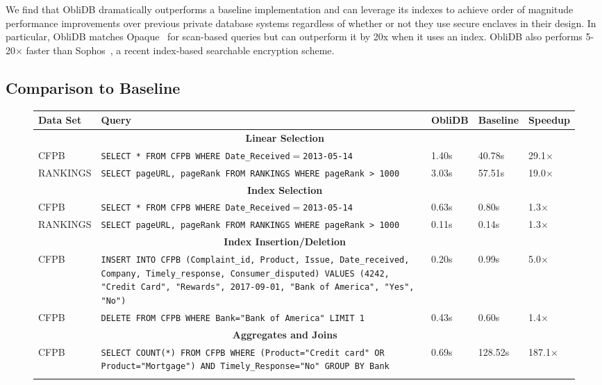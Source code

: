 \documentclass[letterpaper,twocolumn,10pt]{article}
\def\name/{ObliDB}
\begin{document}
We find that \name/ dramatically outperforms a baseline implementation and can leverage its indexes to achieve order of magnitude performance improvements over previous private database systems regardless of whether or not they use secure enclaves in their design. In particular, \name/ matches Opaque~\cite{ZDB+17} for scan-based queries but can outperform it by 20x when it uses an index. \name/ also performs 5-20$\times$ faster than Sophos~\cite{Bost16}, a recent index-based searchable encryption scheme.

\subsection{Comparison to Baseline}
\begin{figure}
\small
\centering
\begin{tabular}{p{2.2cm} p{8cm} l l l}
 \textbf{Data Set}& \textbf{Query}& \textbf{\name/} & \textbf{Baseline} & \textbf{Speedup}\\ \hline\rule{0pt}{2ex}
 &\multicolumn{2}{c}{\textbf{Linear Selection}}\\\rule{0pt}{2ex}
CFPB & \texttt{SELECT * FROM CFPB WHERE Date\_Received$=$2013-05-14}& 1.40s & 40.78s & 29.1$\times$\\\rule{0pt}{2ex}
RANKINGS & \texttt{SELECT pageURL, pageRank FROM RANKINGS WHERE pageRank > 1000 }& 3.03s & 57.51s& 19.0$\times$ \\\rule{0pt}{2ex}
&\multicolumn{2}{c}{\textbf{Index Selection}}\\\rule{0pt}{2ex}
CFPB & \texttt{SELECT * FROM CFPB WHERE Date\_Received$=$2013-05-14} & 0.63s & 0.80s & 1.3$\times$\\\rule{0pt}{2ex}
RANKINGS & \texttt{SELECT pageURL, pageRank FROM RANKINGS WHERE pageRank > 1000 }& 0.11s & 0.14s& 1.3$\times$ \\\rule{0pt}{2ex}
&\multicolumn{2}{c}{\textbf{Index Insertion/Deletion}}\\\rule{0pt}{2ex}
CFPB & \texttt{INSERT INTO CFPB (Complaint\_id, Product, Issue, Date\_received, Company, Timely\_response, Consumer\_disputed) VALUES (4242, "Credit Card", "Rewards", 2017-09-01, "Bank of America", "Yes", "No")}& 0.20s& 0.99s& 5.0$\times$ \\\rule{0pt}{2ex}
CFPB & \texttt{DELETE FROM CFPB WHERE Bank="Bank of America" LIMIT 1}& 0.43s& 0.60s& 1.4$\times$ \\\rule{0pt}{2ex}
&\multicolumn{2}{c}{\textbf{Aggregates and Joins}}\\\rule{0pt}{2ex}
CFPB & \texttt{SELECT COUNT(*) FROM CFPB WHERE (Product="Credit card" OR Product="Mortgage") AND Timely\_Response="No" GROUP BY Bank}& 0.69s & 128.52s &  187.1$\times$\\\rule{0pt}{2ex}

\end{tabular}
\end{figure}
\end{document}
